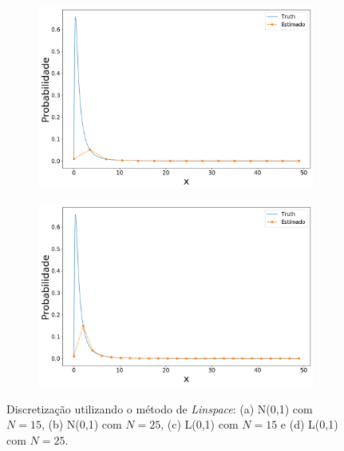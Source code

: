 \begin{figure}[H]
\begin{subfigure}[b]{0.45\textwidth}
		\caption{}
		\label{fig:lin_norm25}
	\end{subfigure}
	\\
	\begin{subfigure}[b]{0.45\textwidth}
		\centering 
		\includegraphics[width=\linewidth]{./figuras/Linspace_lognormal_15}
		\caption{}
		\label{fig:lin_log15}
	\end{subfigure}
	\hfill
	\begin{subfigure}[b]{0.45\textwidth}
		\centering 
		\includegraphics[width=\linewidth]{./figuras/Linspace_lognormal_25}
		\caption{}
		\label{fig:lin_log25}
	\end{subfigure}
	
	\caption{Discretização utilizando o método de \textit{Linspace}: (a) N(0,1) com $N = 15$, (b) N(0,1) com $N = 25$, (c) L(0,1) com $N = 15$ e (d) L(0,1) com $N = 25$.}
	\label{fig:normlin}
\end{figure}

